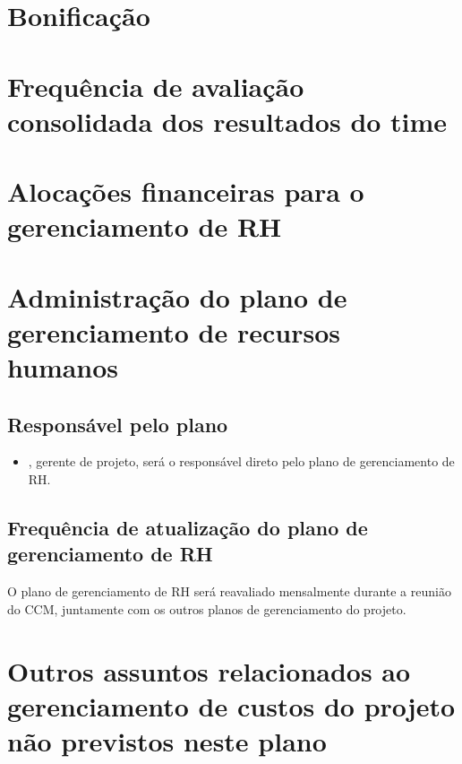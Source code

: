 
\section{Bonificação}


\section{Frequência de avaliação consolidada dos resultados do time}


\section{Alocações financeiras para o gerenciamento de RH}


\section{Administração do plano de gerenciamento de recursos humanos}

\subsection{Responsável pelo plano}

\begin{itemize}
	\item \projectManagerName{}, gerente de projeto, será o responsável direto pelo plano de gerenciamento de RH.
\end{itemize}

\subsection{Frequência de atualização do plano de gerenciamento de RH}

O plano de gerenciamento de RH será reavaliado mensalmente durante a reunião do CCM, juntamente com os outros planos de gerenciamento do projeto.

\section{Outros assuntos relacionados ao gerenciamento de custos do projeto não previstos neste plano}

